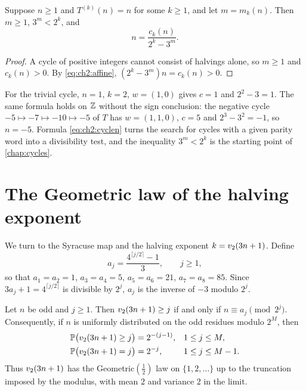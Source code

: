 \begin{corollary}[Cycles]\label{cor:ch2:cycle}
Suppose $n\geq1$ and $T^{(k)}(n)=n$ for some $k\geq1$, and let $m=m_k(n)$.
Then $m\geq1$, $3^m<2^k$, and
\begin{equation}\label{eq:ch2:cyclen}
  n=\frac{c_k(n)}{2^k-3^m}.
\end{equation}
\end{corollary}

\begin{proof}
A cycle of positive integers cannot consist of halvings alone, so $m\geq1$ and
$c_k(n)>0$. By \eqref{eq:ch2:affine}, $(2^k-3^m)n=c_k(n)>0$.
\end{proof}

For the trivial cycle, $n=1$, $k=2$, $w=(1,0)$ gives $c=1$ and
$2^2-3=1$. The same formula holds on $\mathbb{Z}$ without the sign conclusion: the
negative cycle $-5\mapsto-7\mapsto-10\mapsto-5$ of $T$ has $w=(1,1,0)$,
$c=5$ and $2^3-3^2=-1$, so $n=-5$. Formula \eqref{eq:ch2:cyclen} turns the
search for cycles with a given parity word into a divisibility test, and the
inequality $3^m<2^k$ is the starting point of \cref{chap:cycles}.

\section{The Geometric law of the halving exponent}\label{sec:ch2:geom}

We turn to the Syracuse map and the halving exponent $k=v_2(3n+1)$. Define
\[
  a_j=\frac{4^{\lceil j/2\rceil}-1}{3},\qquad j\geq1,
\]
so that $a_1=a_2=1$, $a_3=a_4=5$, $a_5=a_6=21$, $a_7=a_8=85$. Since
$3a_j+1=4^{\lceil j/2\rceil}$ is divisible by $2^j$, $a_j$ is the inverse of
$-3$ modulo $2^j$.

\begin{proposition}\label{prop:geom}
Let $n$ be odd and $j\geq1$. Then $v_2(3n+1)\geq j$ if and only if
$n\equiv a_j\pmod{2^j}$. Consequently, if $n$ is uniformly distributed on the
odd residues modulo $2^M$, then
\begin{align*}
  \mathbb{P}\bigl(v_2(3n+1)\geq j\bigr)&=2^{-(j-1)}, && 1\leq j\leq M,\\
  \mathbb{P}\bigl(v_2(3n+1)=j\bigr)&=2^{-j}, && 1\leq j\leq M-1.
\end{align*}
Thus $v_2(3n+1)$ has the Geometric$(\tfrac12)$ law on $\{1,2,\ldots\}$ up to
the truncation imposed by the modulus, with mean $2$ and variance $2$ in the
limit.
\end{proposition}

